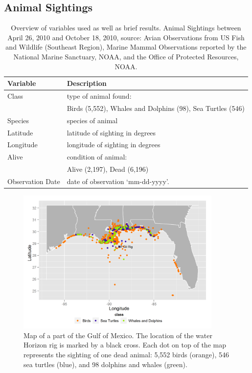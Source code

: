 \documentclass[authoryear,12pt]{elsarticle}
\begin{document}
\subsection{Animal Sightings}
\begin{table}
\begin{tabular}[hbt]{lp{11cm}}\hline
\bf Variable & \bf Description \\\hline
Class & type of animal found: \\
& {\small Birds (5,552),   Whales and Dolphins  (98),  Sea Turtles (546)}\\
Species & species of animal \\
Latitude & latitude {of sighting} in degrees  \\
Longitude & longitude {of sighting} in degrees\\
Alive & condition of animal: \\
& {\small Alive (2,197), Dead (6,196)} \\
Observation Date & date of observation `mm-dd-yyyy'. \\\hline
\end{tabular}
\caption{Overview of variables used as well as brief results. Animal Sightings between April 26, 2010 and October 18, 2010, source: Avian Observations from US Fish and Wildlife (Southeast Region),  Marine Mammal Observations reported by  the National Marine Sanctuary, NOAA, and the Office of Protected Resources, NOAA.}
\label{table-animal}
\end{table}
\begin{figure}[htbp] %
   \centering
   \includegraphics[width=4in]{animal_deaths.png} 
   \caption{Map of a part of the Gulf of Mexico. The location of the 
water Horizon rig is marked by a black cross. Each dot on top of the map represents the sighting of one dead animal: 5,552  birds (orange), 546 sea turtles (blue), and 98 dolphins and whales (green). }
   \label{deaths}
\end{figure}
\end{document}
